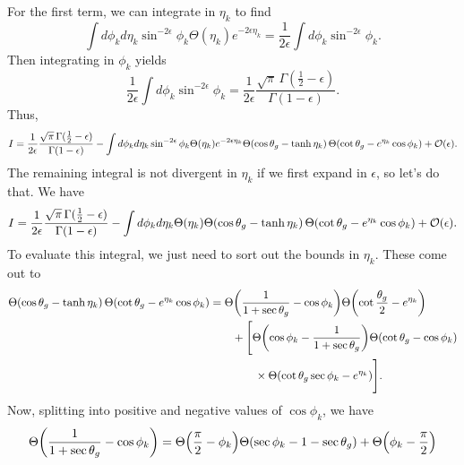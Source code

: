 \documentclass[11pt,twoside,reqno]{amsart}
\theoremstyle{plain}
\theoremstyle{remark}
\theoremstyle{definition}
\theoremstyle{remark}
\theoremstyle{definition}
\theoremstyle{definition}
\newcommand{\cO}{\mathcal{O}}
\begin{document}
	For the first term, we can integrate in $\eta_k$ to find
	\begin{equation}
		\int d\phi_k d\eta_k \sin^{-2\epsilon}\phi_k \Theta(\eta_k) e^{-2\epsilon\eta_k} = \frac{1}{2\epsilon} \int d\phi_k \sin^{-2\epsilon}\phi_k.
	\end{equation}
	Then integrating in $\phi_k$ yields
	\begin{equation}
		\frac{1}{2\epsilon} \int d\phi_k \sin^{-2\epsilon}\phi_k = \frac{1}{2\epsilon}\frac{\sqrt{\pi} \, \Gamma(\frac{1}{2} - \epsilon)}{\Gamma(1 - \epsilon)}.
	\end{equation}
	Thus,
	\begin{equation}
		I = \frac{1}{2\epsilon}\frac{\sqrt{\pi} \, \Gamma(\frac{1}{2} - \epsilon)}{\Gamma(1 - \epsilon)} - \int d\phi_k d\eta_k \sin^{-2\epsilon}\phi_k \Theta(\eta_k) e^{-2\epsilon\eta_k} \Theta(\cos\theta_g - \tanh\eta_k)\,\Theta\qty(\cot\theta_g - e^{\eta_k}\cos\phi_k) + \cO(\epsilon).
	\end{equation}
	The remaining integral is not divergent in $\eta_k$ if we first expand in $\epsilon$, so let's do that. We have
	\begin{equation}\label{eq:integral with divergence extracted}
		I = \frac{1}{2\epsilon}\frac{\sqrt{\pi} \, \Gamma(\frac{1}{2} - \epsilon)}{\Gamma(1 - \epsilon)} - \int d\phi_k d\eta_k \Theta(\eta_k) \Theta(\cos\theta_g - \tanh\eta_k)\,\Theta\qty(\cot\theta_g - e^{\eta_k}\cos\phi_k) + \cO(\epsilon).
	\end{equation}
	To evaluate this integral, we just need to sort out the bounds in $\eta_k$. These come out to
	\begin{equation}
	\begin{aligned}
		\Theta(\cos\theta_g - \tanh\eta_k)\,\Theta\qty(\cot\theta_g - e^{\eta_k}\cos\phi_k) &= \Theta\qty(\frac{1}{1+\sec\theta_g} - \cos\phi_k)\Theta\qty(\cot\frac{\theta_g}{2} - e^{\eta_k}) \\
			&\qquad+ \Bigg[\Theta\qty(\cos\phi_k - \frac{1}{1+\sec\theta_g})\Theta(\cot\theta_g - \cos\phi_k)\\
			&\qquad\qquad \times \Theta\qty(\cot\theta_g\sec\phi_k - e^{\eta_k}) \Bigg].
	\end{aligned}
	\end{equation}
	Now, splitting into positive and negative values of $\cos\phi_k$, we have
	\begin{equation}
		\Theta\qty(\frac{1}{1+\sec\theta_g} - \cos\phi_k) = \Theta\qty(\frac{\pi}{2} - \phi_k)\Theta\qty(\sec\phi_k - 1 - \sec\theta_g) + \Theta\qty(\phi_k - \frac{\pi}{2})
	\end{equation}
\end{document}
